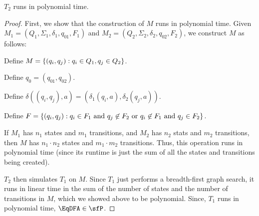 \begin{Answer}
    \newpage
  \begin{claim}
    $T_2$ runs in polynomial time.

    \begin{proof}
      First, we show that the construction of $M$ runs in polynomial time.
      Given $M_1 = (Q_1, \Sigma_1, \delta_1, q_{01}, F_1)$ and
      $M_2 = (Q_2, \Sigma_2, \delta_2, q_{02}, F_2)$, we construct $M$ as follows:
      \begin{enumroman}
        \item Define $M = \left\{ (q_i, q_j) : q_i \in Q_1, q_j \in Q_2\right\}$.
        \item Define $q_0 = (q_{01}, q_{02})$.
        \item Define $\delta((q_i, q_j), a) = (\delta_1(q_i, a), \delta_2(q_j, a))$.
        \item Define $F = \left\{(q_i, q_j) : q_i \in F_1 \text{ and } q_j \not \in F_2
          \text{ or } q_i \not \in F_1 \text{ and } q_j \in F_2\right\}$.
      \end{enumroman}

      \step
      If $M_1$ has $n_1$ states and $m_1$ transitions, and $M_2$ has $n_2$ stats
      and $m_2$ transitions, then $M$ has $n_1 \cdot n_2$ states
      and $m_1 \cdot m_2$ transitions. Thus, this operation runs in polynomial time
      (since its runtime is just the sum of all the states and transitions being created).

      $T_2$ then simulates $T_1$ on $M$. Since $T_1$ just performs a breadth-first
      graph search, it runs in linear time in the sum of the number of states
      and the number of transitions in $M$, which we showed above to be polynomial.
      Since, $T_1$ runs in polynomial time, $\EqDFA \in \sfP$.
    \end{proof}
  \end{claim}
\end{Answer}


